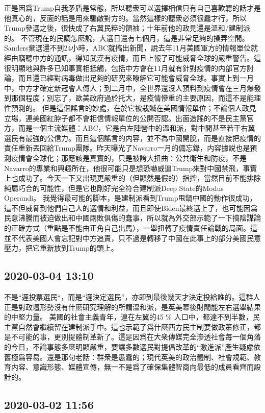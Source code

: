\documentclass[twocolumn]{ctexart}
\begin{document}
正是因爲Trump自我矛盾是常態，所以聽衆可以選擇相信只有自己喜歡聼的話才是他真心的，反面的話是用來騙敵對方的。當然這樣的聽衆必須很蠢才行，所以Trump參選之後，很快成了右翼民粹的領袖；十年前他的政見還是溫和/建制派的。
不管現在的民調怎麽說，大選日還有七個月，這是非常足夠的操弄空間。Sanders棄選還不到24小時，ABC就搞出新聞，說去年11月美國軍方的情報單位就經由竊聽中方的通訊，得知武漢有疫情，而且上報了可能威脅全球的嚴重警告。這很明顯地與許多已知事實相抵觸，包括中方會在11月就有針對疫情的内部官方討論，而且還已經對病毒做出足夠的研究來瞭解它可能會威脅全球。事實上到一月中，中方才確定新冠會人傳人；到二月中，全世界還沒人預料到疫情會在三月爆發到那個程度；別忘了，歐美政府過於托大，是疫情慘重的主要原因，而這不是能理性預測的。
但是這個謠言的妙處，在於它被栽贓在美國情報單位；不論個人政見立場，連美國紅脖子都不會相信情報單位的公開否認。出面造謠的不是民主黨官方，而是一個主流媒體：ABC，它是白左陣營中的溫和派，對中間甚至若干右翼選民有最強的公信力。而且這個謠言的内容，並不為中國開脫，而是直接把疫情的責任重新丟回給Trump團隊。昨天曝光了Navarro一月的備忘錄，内容據説也是預測疫情會全球化；那應該是真實的，只是被誇大扭曲：公共衛生和防疫，不是Navarro的專業和興趣所在，他很可能只是想恐嚇威逼Trump來對中國禁飛，事實上也成功了。今天一下又出現更嚴重的（但顯然是假的）指控，當然目前不能排除純屬巧合的可能性，但是它也剛好完全符合建制派Deep State的Modus Operandi。
我覺得最可能的脚本，是建制派看到Trump甩鍋中國的動作很成功，這不但威脅到他們自己人的選情和利益，而且即使Biden最終選上了，也可能因爲民意沸騰而被迫做出和中國兩敗俱傷的蠢事，所以就為外交部示範了一下搞陰謀論的正確方式（重點是不能由正角自己出馬），一舉扭轉了疫情責任論戰的局面。這並不代表美國人會忘記對中方追責，只不過是轉移了中國在此事上的部分美國民意壓力，把它重新放到Trump的頭上。
\subsection*{2020-03-04 13:10}

不是“遲投票選民“，而是“遲決定選民”，亦即到最後幾天才決定投給誰的。這群人正是對政壇形勢沒有什麽研究理解的所謂溫和派，是英美幕後財閥能左右選舉結果的中堅力量。
美國的社會主義青年，連在左翼的45 \% 人口中，都達不到半數，民主黨自然會繼續留在建制派手中。這也示範了爲什麽西方民主制要做政策修正，都是不可能的事，更別提體制革新了。這是因爲在大衆傳媒完全滲透社會每一個角落的今日，不論事態多麽明顯嚴重，要讓多數選民對提倡改革的“激進派”產生疑慮依舊極爲容易。還是那句老話：群衆是愚蠢的；現代英美的政治體制、社會規範、教育内容、意識形態、媒體宣傳，無一不是爲了確保集體智商向最低的成員看齊而設計的。
\subsection*{2020-03-02 11:56}
\end{document}
